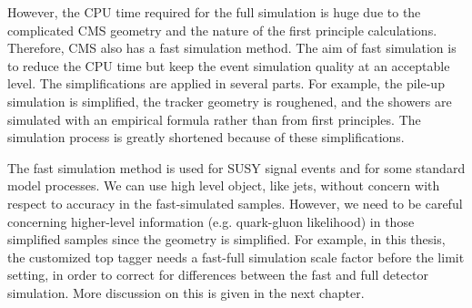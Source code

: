 However, the CPU time required for the full simulation is huge due to the complicated CMS geometry and the nature of the first principle calculations. Therefore, CMS also has a fast simulation method\cite{1742-6596-396-6-062016}. The aim of fast simulation is to reduce the CPU time but keep the event simulation quality at an acceptable level. The simplifications are applied in several parts. For example, the pile-up simulation is simplified, the tracker geometry is roughened, and the showers are simulated with an empirical formula rather than from first principles. The simulation process is greatly shortened because of these simplifications. 

The fast simulation method is used for SUSY signal events and for some standard model processes. We can use high level object, like jets, without concern with respect to accuracy in the fast-simulated samples. However, we need to be careful concerning higher-level information (e.g. quark-gluon likelihood) in those simplified samples since the geometry is simplified. For example, in this thesis, the customized top tagger needs a fast-full simulation scale factor before the limit setting, in order to correct for differences between the fast and full detector simulation. More discussion on this is given in the next chapter. 
